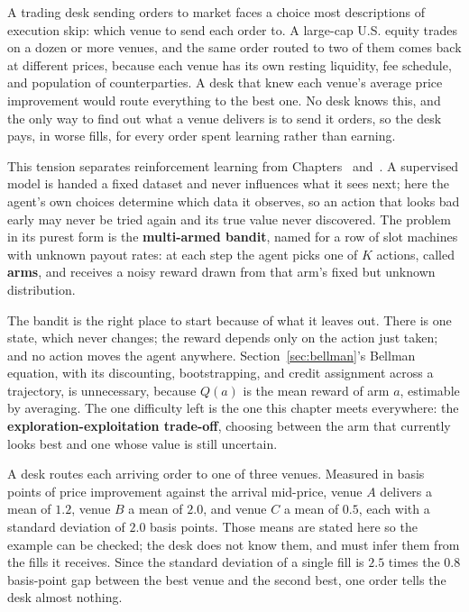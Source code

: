 \documentclass[../ai_in_finance]{subfiles}
\begin{document}
A trading desk sending orders to market faces a choice most descriptions of execution skip: which venue to send each order to. A large-cap U.S. equity trades on a dozen or more venues, and the same order routed to two of them comes back at different prices, because each venue has its own resting liquidity, fee schedule, and population of counterparties. A desk that knew each venue's average price improvement would route everything to the best one. No desk knows this, and the only way to find out what a venue delivers is to send it orders, so the desk pays, in worse fills, for every order spent learning rather than earning.

This tension separates reinforcement learning from Chapters~ and~. A supervised model is handed a fixed dataset and never influences what it sees next; here the agent's own choices determine which data it observes, so an action that looks bad early may never be tried again and its true value never discovered. The problem in its purest form is the \textbf{multi-armed bandit}, named for a row of slot machines with unknown payout rates: at each step the agent picks one of $K$ actions, called \textbf{arms}, and receives a noisy reward drawn from that arm's fixed but unknown distribution.

The bandit is the right place to start because of what it leaves out. There is one state, which never changes; the reward depends only on the action just taken; and no action moves the agent anywhere. Section~\ref{sec:bellman}'s Bellman equation, with its discounting, bootstrapping, and credit assignment across a trajectory, is unnecessary, because $Q(a)$ is the mean reward of arm $a$, estimable by averaging. The one difficulty left is the one this chapter meets everywhere: the \textbf{exploration-exploitation trade-off}, choosing between the arm that currently looks best and one whose value is still uncertain.

\label{sec:rl-bandit-worked}

A desk routes each arriving order to one of three venues. Measured in basis points of price improvement against the arrival mid-price, venue $A$ delivers a mean of $1.2$, venue $B$ a mean of $2.0$, and venue $C$ a mean of $0.5$, each with a standard deviation of $2.0$ basis points. Those means are stated here so the example can be checked; the desk does not know them, and must infer them from the fills it receives. Since the standard deviation of a single fill is $2.5$ times the $0.8$ basis-point gap between the best venue and the second best, one order tells the desk almost nothing.
\end{document}
